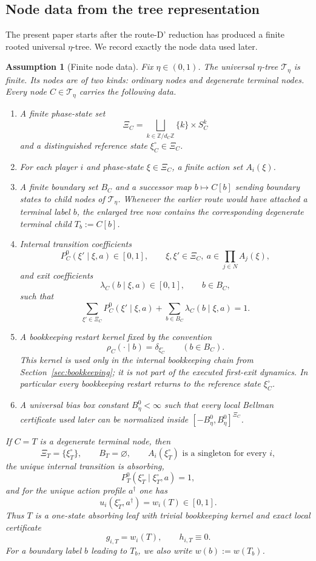 \documentclass[12pt]{article}
\newtheorem{assumption}[theorem]{Assumption}
\theoremstyle{definition}
\newcommand{\1}{\mathbf{1}}
\newcommand{\cT}{\mathcal{T}}
\begin{document}
\subsection{Node data from the tree representation}

The present paper starts after the route-D' reduction has produced a finite rooted
universal $\eta$-tree. We record exactly the node data used later.

\begin{assumption}[Finite node data]
\label{ass:node-data}
Fix $\eta\in(0,1)$. The universal $\eta$-tree $\cT_\eta$ is finite. Its nodes are
of two kinds: ordinary nodes and degenerate terminal nodes. Every node
$C\in \cT_\eta$ carries the following data.
\begin{enumerate}[label=\textnormal{(D\arabic*)},leftmargin=2.8em]
\item A finite phase-state set
\[
\Xi_C=\bigsqcup_{k\in\mathbb Z/d_C\mathbb Z}\{k\}\times S_C^k
\]
and a distinguished reference state $\xi_C^\circ\in\Xi_C$.
\item For each player $i$ and phase-state $\xi\in\Xi_C$, a finite action set
$A_i(\xi)$.
\item A finite boundary set $B_C$ and a successor map $b\mapsto C[b]$ sending
boundary states to child nodes of $\cT_\eta$. Whenever the earlier route would
have attached a terminal label $b$, the enlarged tree now contains the
corresponding degenerate terminal child $T_b:=C[b]$.
\item Internal transition coefficients
\[
P_C^0(\xi'\mid \xi,a)\in[0,1],
\qquad \xi,\xi'\in \Xi_C,
\ a\in \prod_{j\in N}A_j(\xi),
\]
and exit coefficients
\[
\lambda_C(b\mid \xi,a)\in[0,1],
\qquad b\in B_C,
\]
such that
\[
\sum_{\xi'\in\Xi_C}P_C^0(\xi'\mid \xi,a)+\sum_{b\in B_C}\lambda_C(b\mid\xi,a)=1.
\]
\item A bookkeeping restart kernel fixed by the convention
\[
\rho_C(\cdot\mid b)=\delta_{\xi_C^\circ}
\qquad (b\in B_C).
\]
This kernel is used only in the internal bookkeeping chain from
Section~\ref{sec:bookkeeping}; it is not part of the executed first-exit
dynamics. In particular every bookkeeping restart returns to the reference
state $\xi_C^\circ$.
\item A universal bias box constant $B_\eta^0<\infty$ such that every local
Bellman certificate used later can be normalized inside
$[-B_\eta^0,B_\eta^0]^{\Xi_C}$.
\end{enumerate}

If $C=T$ is a degenerate terminal node, then
\[
\Xi_T=\{\xi_T^\circ\},
\qquad
B_T=\varnothing,
\qquad
A_i(\xi_T^\circ)\text{ is a singleton for every }i,
\]
the unique internal transition is absorbing,
\[
P_T^0(\xi_T^\circ\mid \xi_T^\circ,a)=1,
\]
and for the unique action profile $a^\dagger$ one has
\[
u_i(\xi_T^\circ,a^\dagger)=w_i(T)\in[0,1].
\]
Thus $T$ is a one-state absorbing leaf with trivial bookkeeping kernel and exact
local certificate
\[
g_{i,T}=w_i(T),
\qquad
h_{i,T}\equiv 0.
\]
For a boundary label $b$ leading to $T_b$, we also write $w(b):=w(T_b)$.
\end{assumption}
\end{document}
